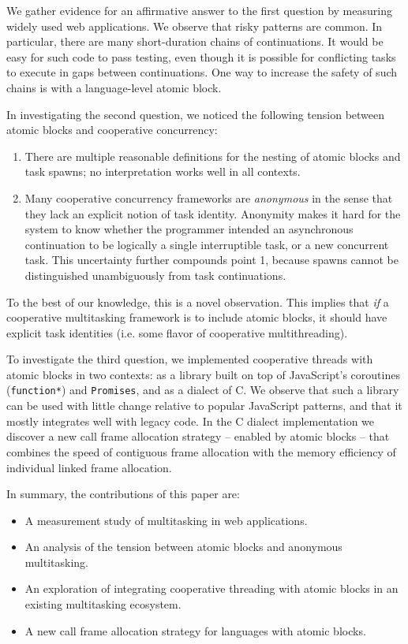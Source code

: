 \documentclass[acmsmall,anonymous,review]{acmart}\settopmatter{printfolios=true,printccs=false,printacmref=false}
\begin{document}
We gather evidence for an affirmative answer to the first question by measuring widely used web applications\footnotemark{}.
We observe that risky patterns are common.
In particular, there are many short-duration chains of continuations.
It would be easy for such code to pass testing, even though it is possible for conflicting tasks to execute in gaps between continuations.
One way to increase the safety of such chains is with a language-level atomic block.


In investigating the second question, we noticed the following tension between atomic blocks and cooperative concurrency:
\begin{enumerate}
\item There are multiple reasonable definitions for the nesting of atomic blocks and task spawns; no interpretation works well in all contexts.
\item Many cooperative concurrency frameworks are \emph{anonymous} in the sense that they lack an explicit notion of task identity.
  Anonymity makes it hard for the system to know whether the programmer intended an asynchronous continuation to be logically a single interruptible task, or a new concurrent task.
  This uncertainty further compounds point 1, because spawns cannot be distinguished unambiguously from task continuations.
\end{enumerate}
To the best of our knowledge, this is a novel observation.
This implies that \emph{if} a cooperative multitasking framework is to include atomic blocks, it should have explicit task identities (i.e. some flavor of cooperative multithreading).

To investigate the third question, we implemented cooperative threads with atomic blocks in two contexts: as a library built on top of JavaScript's coroutines (\texttt{function*}) and \texttt{Promises}, and as a dialect of C.
We observe that such a library can be used with little change relative to popular JavaScript patterns, and that it mostly integrates well with legacy code.
In the C dialect implementation we discover a new call frame allocation strategy -- enabled by atomic blocks -- that combines the speed of contiguous frame allocation with the memory efficiency of individual linked frame allocation.

In summary, the contributions of this paper are:
\begin{itemize}
\item A measurement study of multitasking in web applications.
\item An analysis of the tension between atomic blocks and anonymous multitasking.
\item An exploration of integrating cooperative threading with atomic blocks in an existing multitasking ecosystem.
\item A new call frame allocation strategy for languages with atomic blocks.
\end{itemize}
\end{document}
